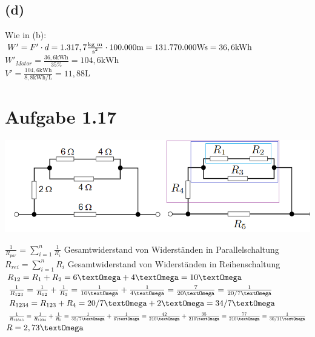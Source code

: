 \documentclass[]{article}
\newcommand{\unit}[1]{\text{#1}}
\newcommand{\fracunit}[2]{\frac{\unit{#1}}{\unit{#2}}}
\newcommand{\textsq}[1]{\ensuremath{\text{#1}^2}}
\begin{document}
\subsection*{(d)}
	Wie in (b):\\
	$W' = F' \cdot d = 1.317,7\fracunit{kg~m}{\textsq{s}} \cdot 100.000\unit{m} = 131.770.000\unit{Ws} = 36,6\unit{kWh}$\\
	$W'_{Motor} = \frac{36,6\unit{kWh}}{35\%} = 104,6\unit{kWh}$\\
	$V' = \frac{104,6\unit{kWh}}{8,8\unit{kWh/L}} = 11,88\unit{L}$

\section*{Aufgabe 1.17}
\par
	\includegraphics[scale=0.6]{Skizze_A1_17.png}\par
	$\frac{1}{R_{par}} = \sum_{i=1}^{n} \frac{1}{R_i}$ Gesamtwiderstand von Widerständen in Parallelschaltung \\
	$R_{rei} = \sum_{i=1}^{n} {R_i}$ Gesamtwiderstand von Widerständen in Reihenschaltung \\

	$R_{12} = R_1 + R_2 = 6\unit{\textOmega} + 4\unit{\textOmega} = 10\unit{\textOmega}$\\
	$\frac{1}{R_{123}} = \frac{1}{R_{12}} + \frac{1}{R_3} = \frac{1}{10\unit{\textOmega}}+ \frac{1}{4\unit{\textOmega}} = \frac{7}{20\unit{\textOmega}} = \frac{1}{20/7\unit{\textOmega}}$\\
	$R_{1234} = R_{123} +  R_4 = 20/7\unit{\textOmega} + 2\unit{\textOmega} = 34/7\unit{\textOmega}$\\
	$\frac{1}{R_{12345}} = \frac{1}{R_{1234}} + \frac{1}{R_5} = \frac{1}{35/7\unit{\textOmega}} + \frac{1}{6\unit{\textOmega}} = \frac{42}{210\unit{\textOmega}} + \frac{35}{210\unit{\textOmega}} = \frac{77}{210\unit{\textOmega}} = \frac{1}{30/11\unit{\textOmega}}$\\
	$R = 2,73\unit{\textOmega}$
\end{document}
